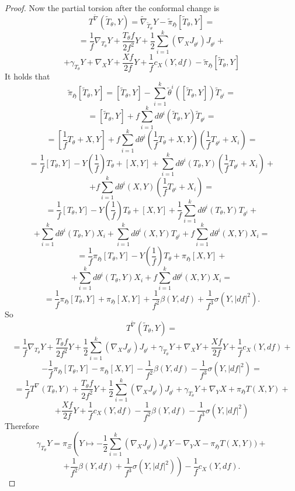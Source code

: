 \documentclass{article}
\newcommand{\g}[1]{\mathfrak{#1}}
\theoremstyle{definition}
\theoremstyle{remark}
\begin{document}
\begin{proof}
 Now the partial torsion after the conformal change is
 $$T^{\widetilde{\nabla}}(\widetilde{T}_{\theta},Y) = \widetilde{\nabla}_{\widetilde{T}_{\theta}}Y - \widetilde{\pi}_{\g{H}}[\widetilde{T}_{\theta},Y] =$$
 $$= \frac{1}{f}\nabla_{T_{\theta}}Y + \frac{T_{\theta}f}{2f^2}Y + \frac{1}{2}\sum_{i=1}^k(\nabla_XJ_{\theta^i})J_{\theta^i}+$$
 $$+\gamma_{T_{\theta}}Y + \nabla_XY + \frac{Xf}{2f}Y + \frac{1}{f}c_X(Y,df) - \widetilde{\pi}_{\g{H}}[\widetilde{T}_{\theta},Y] $$
 It holds that
 $$\widetilde{\pi}_{\g{H}}[\widetilde{T}_{\theta},Y] = [\widetilde{T}_{\theta},Y] - \sum_{i=1}^k\widetilde{\theta}^i([\widetilde{T}_{\theta},Y])\widetilde{T}_{\theta^i} =$$
 $$= [\widetilde{T}_{\theta},Y] + f\sum_{i=1}^kd\theta^i(\widetilde{T}_{\theta},Y)\widetilde{T}_{\theta^i} =$$
 $$= [\frac{1}{f}T_{\theta}+X,Y] + f\sum_{i=1}^kd\theta^i(\frac{1}{f}T_{\theta}+X,Y)\left(\frac{1}{f}T_{\theta^i} + X_i \right)=$$
 $$= \frac{1}{f}[T_{\theta},Y] - Y\left(\frac{1}{f}\right)T_{\theta} + [X,Y] + \sum_{i=1}^kd\theta^i(T_{\theta},Y)\left(\frac{1}{f}T_{\theta^i}+ X_i \right)+$$
 $$ + f\sum_{i=1}^kd\theta^i(X,Y)\left(\frac{1}{f}T_{\theta^i} + X_i \right) =$$
 $$= \frac{1}{f}[T_{\theta},Y] - Y\left(\frac{1}{f}\right)T_{\theta} + [X,Y] + \frac{1}{f}\sum_{i=1}^kd\theta^i(T_{\theta},Y)T_{\theta^i} +$$
 $$+ \sum_{i=1}^kd\theta^i(T_{\theta},Y)X_i + \sum_{i=1}^kd\theta^i(X,Y)T_{\theta^i}+ f\sum_{i=1}^kd\theta^i(X,Y)X_i=$$
 $$= \frac{1}{f}\pi_{\g{H}}[T_{\theta},Y] - Y\left(\frac{1}{f}\right)T_{\theta} + \pi_{\g{H}}[X,Y] +$$
 $$+ \sum_{i=1}^kd\theta^i(T_{\theta},Y)X_i + f\sum_{i=1}^kd\theta^i(X,Y)X_i=$$
 $$= \frac{1}{f}\pi_{\g{H}}[T_{\theta},Y] + \pi_{\g{H}}[X,Y] + \frac{1}{f^2}\beta(Y,df) + \frac{1}{f^3}\sigma(Y,|df|^2).$$
 So
 $$T^{\widetilde{\nabla}}(\widetilde{T}_{\theta},Y) =$$
 $$= \frac{1}{f}\nabla_{T_{\theta}}Y + \frac{T_{\theta}f}{2f^2}Y + \frac{1}{2}\sum_{i=1}^k(\nabla_XJ_{\theta^i})J_{\theta^i}+\gamma_{T_{\theta}}Y + \nabla_XY + \frac{Xf}{2f}Y + \frac{1}{f}c_X(Y,df)+$$
 $$ - \frac{1}{f}\pi_{\g{H}}[T_{\theta},Y] - \pi_{\g{H}}[X,Y] - \frac{1}{f^2}\beta(Y,df) -\frac{1}{f^3}\sigma(Y,|df|^2) =$$
 $$= \frac{1}{f}T^{\nabla}(T_{\theta},Y) + \frac{T_{\theta}f}{2f^2}Y + \frac{1}{2}\sum_{i=1}^k(\nabla_XJ_{\theta^i})J_{\theta^i}+\gamma_{T_{\theta}}Y + \nabla_YX +\pi_{\g{H}}T(X,Y) +$$
 $$+ \frac{Xf}{2f}Y + \frac{1}{f}c_X(Y,df) - \frac{1}{f^2}\beta(Y,df) -\frac{1}{f^3}\sigma(Y,|df|^2)$$
 Therefore
 $$\gamma_{T_{\theta}}Y =\pi_{\Xi}\left(Y\mapsto -\frac{1}{2}\sum_{i=1}^k(\nabla_XJ_{\theta^i})J_{\theta^i}Y - \nabla_YX - \pi_{\g{H}}T(X,Y))+\right.$$
 $$\left. +\frac{1}{f^2}\beta(Y,df) +\frac{1}{f^3}\sigma(Y,|df|^2) \right)-\frac{1}{f}c_X(Y,df).$$
\end{proof}
\end{document}

